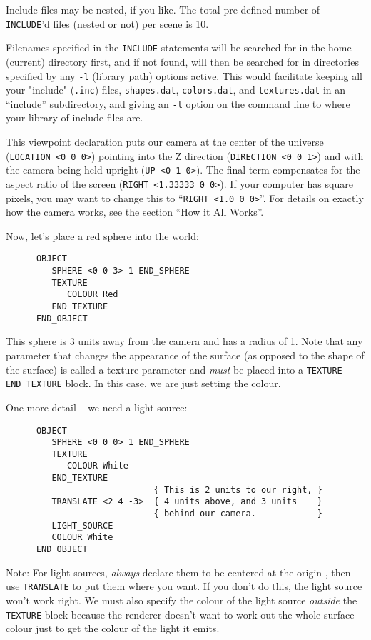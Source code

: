 Include files may be nested, if you like.  The total pre-defined number of
{\tt INCLUDE}'d files (nested or not) per scene is 10.

Filenames specified in the {\tt INCLUDE} statements will be searched
for in the home (current) directory first, and if not found, will then
be searched for in directories specified by any {\tt -l}
(library path) options active.  This would facilitate keeping all your
"include" ({\tt .inc}) files, {\tt shapes.dat}, {\tt colors.dat}, and
{\tt textures.dat} in an ``include'' subdirectory, and giving an
{\tt -l} option on the command line to where your library of include files
are.

This viewpoint declaration puts our camera at the center of the
universe ({\tt LOCATION <0 0 0>}) pointing into the Z direction
({\tt DIRECTION <0 0 1>}) and with the camera being held upright
({\tt UP <0 1 0>}).  The final term compensates for the aspect ratio
of the screen
({\tt RIGHT <1.33333 0 0>}).  If your computer has square pixels, you
may want to change this to ``{\tt RIGHT <1.0 0 0>}''.  For details on
exactly how the camera works, see the section ``How it All Works''.

Now, let's place a red sphere into the world:
\begin{verbatim}
      OBJECT
         SPHERE <0 0 3> 1 END_SPHERE
         TEXTURE
            COLOUR Red
         END_TEXTURE
      END_OBJECT
\end{verbatim}
This sphere is 3 units away from the camera and has a radius of 1.  Note that
any parameter that changes the appearance of the surface (as opposed to the
shape of the surface) is called a texture parameter and {\em must} be
placed into a
\verb#TEXTURE#-\verb#END_TEXTURE# block.  In this case, we are just
setting the colour.

One more detail -- we need a light source:
\begin{verbatim}
      OBJECT
         SPHERE <0 0 0> 1 END_SPHERE
         TEXTURE
            COLOUR White
         END_TEXTURE
                             { This is 2 units to our right, }
         TRANSLATE <2 4 -3>  { 4 units above, and 3 units    }
                             { behind our camera.            }
         LIGHT_SOURCE
         COLOUR White
      END_OBJECT
\end{verbatim}
Note: For light sources, {\em always} declare them to be centered at
the origin {\tt <0 0 0>}, then use {\tt TRANSLATE} to put them where
you want.
If you don't do this, the light source won't work right. We
must also specify the colour of the light source {\em outside} the
{\tt TEXTURE} block because the renderer doesn't want to work out the
whole surface colour just to get the colour of the light it
emits.


